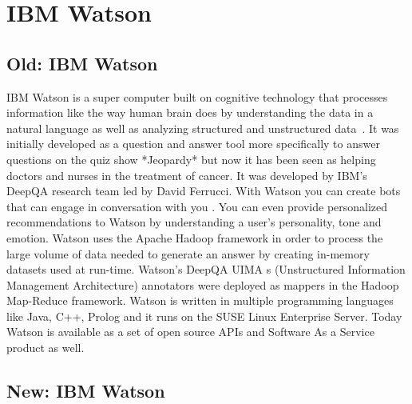 \section{IBM Watson}

\subsection{Old: IBM Watson}

IBM Watson is a super computer built on cognitive technology that
processes information like the way human brain does by understanding
the data in a natural language as well as analyzing structured and
unstructured data~\cite{www-ibmwatson-wiki}.  It was initially
developed as a question and answer tool more specifically to answer
questions on the quiz show *Jeopardy* but now it has been seen as
helping doctors and nurses in the treatment of cancer. It was
developed by IBM's DeepQA research team led by David Ferrucci. With
Watson you can create bots that can engage in conversation with you
\cite{www-ibmwatson}. You can even provide personalized
recommendations to Watson by understanding a user's personality, tone
and emotion. Watson uses the Apache Hadoop framework in order to
process the large volume of data needed to generate an answer by
creating in-memory datasets used at run-time. Watson's DeepQA UIMA
s (Unstructured Information Management Architecture) annotators were
deployed as mappers in the Hadoop Map-Reduce framework. Watson is
written in multiple programming languages like Java, C++, Prolog and
it runs on the SUSE Linux Enterprise Server. Today Watson is available
as a set of open source APIs and Software As a Service product as
well\cite{www-ibmwatson}.


\subsection{New: IBM Watson}

